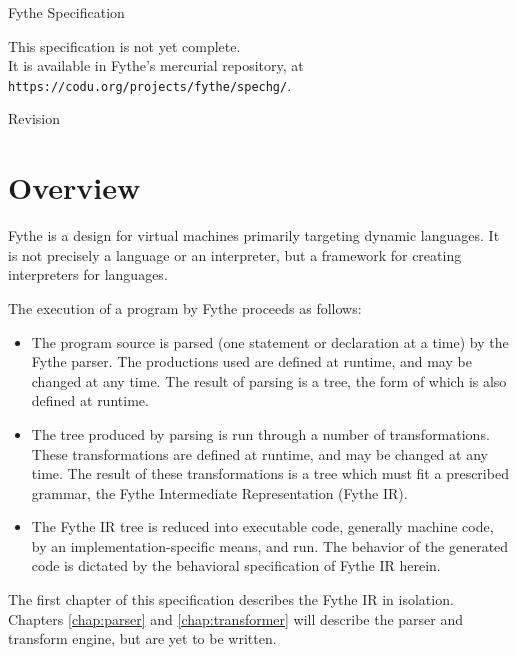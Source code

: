 \usepackage{multicol}

\setlength{\pdfpageheight}{\paperheight}
\setlength{\pdfpagewidth}{\paperwidth}



\ifdefined\specdocheader
    \specdocheader
\else\fi

\begin{titlepage}
\begin{center}

\Huge{\textsf{Fythe Specification}}

\small{This specification is not yet complete.\\It is available in Fythe's mercurial repository, at \texttt{https://codu.org/projects/fythe/spechg/}.}

\Large{\textsf{Revision }}

\large{}

\end{center}
\end{titlepage}

\tableofcontents

\chapter{Overview}

Fythe is a design for virtual machines primarily targeting dynamic languages.
It is not precisely a language or an interpreter, but a framework for creating
interpreters for languages.

The execution of a program by Fythe proceeds as follows:

\begin{itemize}
\item
The program source is parsed (one statement or declaration at a time) by the
Fythe parser. The productions used are defined at runtime, and may be changed
at any time. The result of parsing is a tree, the form of which is also defined
at runtime.

\item
The tree produced by parsing is run through a number of transformations.  These
transformations are defined at runtime, and may be changed at any time. The
result of these transformations is a tree which must fit a prescribed grammar,
the Fythe Intermediate Representation (Fythe IR).

\item
The Fythe IR tree is reduced into executable code, generally machine code, by
an implementation-specific means, and run. The behavior of the generated code
is dictated by the behavioral specification of Fythe IR herein.
\end{itemize}

The first chapter of this specification describes the Fythe IR in isolation.
Chapters \ref{chap:parser} and \ref{chap:transformer} will describe the parser
and transform engine, but are yet to be written.






